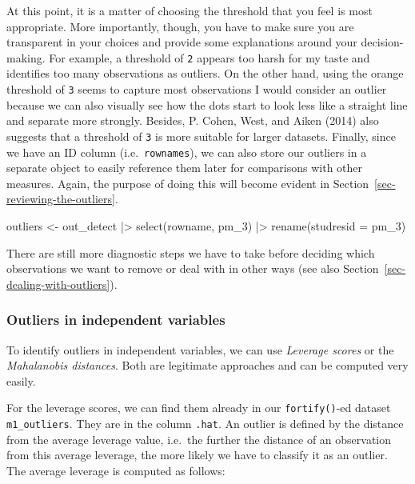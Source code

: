 \documentclass[
  letterpaper,
]{krantz}
\makeatletter
\newenvironment{Shaded}{\begin{snugshade}}{\end{snugshade}}
\newcommand{\AttributeTok}[1]{\textcolor[rgb]{0.40,0.45,0.13}{#1}}
\newcommand{\FunctionTok}[1]{\textcolor[rgb]{0.28,0.35,0.67}{#1}}
\newcommand{\NormalTok}[1]{\textcolor[rgb]{0.00,0.23,0.31}{#1}}
\newcommand{\OtherTok}[1]{\textcolor[rgb]{0.00,0.23,0.31}{#1}}
\newcommand{\SpecialCharTok}[1]{\textcolor[rgb]{0.37,0.37,0.37}{#1}}
\newenvironment{kframe}{%
\medskip{}
\setlength{\fboxsep}{.8em}
 \def\at@end@of@kframe{}%
 \ifinner\ifhmode%
  \def\at@end@of@kframe{\end{minipage}}%
  \begin{minipage}{\columnwidth}%
 \fi\fi%
 \def\FrameCommand##1{\hskip\@totalleftmargin \hskip-\fboxsep
 \colorbox{shadecolor}{##1}\hskip-\fboxsep
     \hskip-\linewidth \hskip-\@totalleftmargin \hskip\columnwidth}%
 \MakeFramed {\advance\hsize-\width
   \@totalleftmargin\z@ \linewidth\hsize
   \@setminipage}}%
 {\par\unskip\endMakeFramed%
 \at@end@of@kframe}
\renewenvironment{Shaded}{\begin{kframe}}{\end{kframe}}
\makeatother
\begin{document}
At this point, it is a matter of choosing the threshold that you feel is
most appropriate. More importantly, though, you have to make sure you
are transparent in your choices and provide some explanations around
your decision-making. For example, a threshold of \texttt{2} appears too
harsh for my taste and identifies too many observations as outliers. On
the other hand, using the orange threshold of \texttt{3} seems to
capture most observations I would consider an outlier because we can
also visually see how the dots start to look less like a straight line
and separate more strongly. Besides, P. Cohen, West, and Aiken (2014)
also suggests that a threshold of \texttt{3} is more suitable for larger
datasets. Finally, since we have an ID column (i.e.~\texttt{rownames}),
we can also store our outliers in a separate object to easily reference
them later for comparisons with other measures. Again, the purpose of
doing this will become evident in
Section~\ref{sec-reviewing-the-outliers}.

\begin{Shaded}
\begin{Highlighting}[]
\NormalTok{outliers }\OtherTok{\textless{}{-}}
\NormalTok{  out\_detect }\SpecialCharTok{|\textgreater{}}
  \FunctionTok{select}\NormalTok{(rowname, pm\_3) }\SpecialCharTok{|\textgreater{}}
  \FunctionTok{rename}\NormalTok{(}\AttributeTok{studresid =}\NormalTok{ pm\_3)}
\end{Highlighting}
\end{Shaded}

There are still more diagnostic steps we have to take before deciding
which observations we want to remove or deal with in other ways (see
also Section~\ref{sec-dealing-with-outliers}).

\subsubsection{Outliers in independent
variables}\label{sec-outliers-in-the-independent-variables}

To identify outliers in independent variables, we can use \emph{Leverage
scores} or the \emph{Mahalanobis distances}. Both are legitimate
approaches and can be computed very easily.

For the leverage scores, we can find them already in our
\texttt{fortify()}-ed dataset \texttt{m1\_outliers}. They are in the
column \texttt{.hat}. An outlier is defined by the distance from the
average leverage value, i.e.~the further the distance of an observation
from this average leverage, the more likely we have to classify it as an
outlier. The average leverage is computed as follows:
\end{document}
